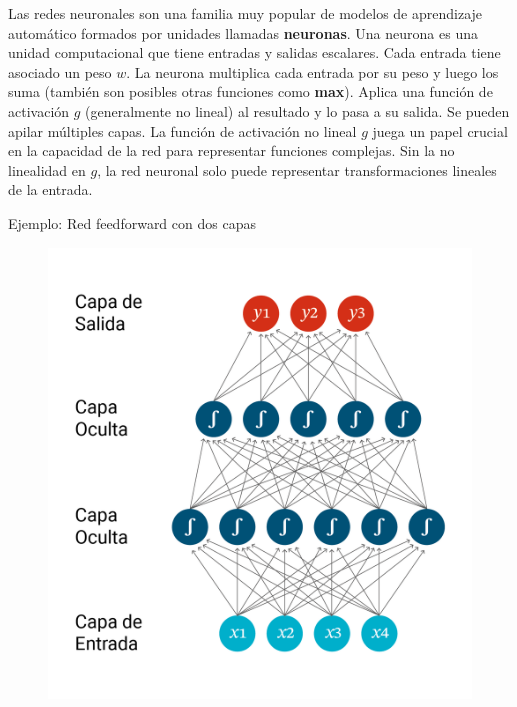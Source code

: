 


Las redes neuronales son una familia muy popular de modelos de aprendizaje automático formados por unidades llamadas \textbf{neuronas}. Una neurona es una unidad computacional que tiene entradas y salidas escalares. Cada entrada tiene asociado un peso $w$. La neurona multiplica cada entrada por su peso y luego los suma (también son posibles otras funciones como \textbf{max}).  Aplica una función de activación $g$ (generalmente no lineal) al resultado y lo pasa a su salida. Se pueden apilar múltiples capas.  La función de activación no lineal $g$ juega un papel crucial en la capacidad de la red para representar funciones complejas.  Sin la no linealidad en $g$, la red neuronal solo puede representar transformaciones lineales de la entrada.

Ejemplo: Red feedforward con dos capas

\begin{figure}[htb]
	\centering
	 \includegraphics[scale=0.38]{pics/NN-example.png}
\end{figure}

